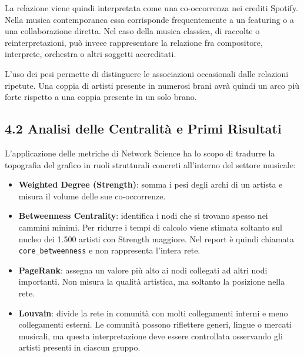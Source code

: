 \documentclass[
]{article}
\begin{document}
La relazione viene quindi interpretata come una co-occorrenza nei
crediti Spotify. Nella musica contemporanea essa corrisponde
frequentemente a un featuring o a una collaborazione diretta. Nel caso
della musica classica, di raccolte o reinterpretazioni, può invece
rappresentare la relazione fra compositore, interprete, orchestra o
altri soggetti accreditati.

L'uso dei pesi permette di distinguere le associazioni occasionali dalle
relazioni ripetute. Una coppia di artisti presente in numerosi brani
avrà quindi un arco più forte rispetto a una coppia presente in un solo
brano.

\subsection{4.2 Analisi delle Centralità e Primi
Risultati}\label{analisi-delle-centralituxe0-e-primi-risultati}

L'applicazione delle metriche di Network Science ha lo scopo di tradurre
la topografia del grafico in ruoli strutturali concreti all'interno del
settore musicale:

\begin{itemize}
\item
  \textbf{Weighted Degree (Strength)}: somma i pesi degli archi di un
  artista e misura il volume delle sue co-occorrenze.
\item
  \textbf{Betweenness Centrality}: identifica i nodi che si trovano
  spesso nei cammini minimi. Per ridurre i tempi di calcolo viene
  stimata soltanto sul nucleo dei 1.500 artisti con Strength maggiore.
  Nel report è quindi chiamata \texttt{core\_betweenness} e non
  rappresenta l'intera rete.
\item
  \textbf{PageRank}: assegna un valore più alto ai nodi collegati ad
  altri nodi importanti. Non misura la qualità artistica, ma soltanto la
  posizione nella rete.
\item
  \textbf{Louvain}: divide la rete in comunità con molti collegamenti
  interni e meno collegamenti esterni. Le comunità possono riflettere
  generi, lingue o mercati musicali, ma questa interpretazione deve
  essere controllata osservando gli artisti presenti in ciascun gruppo.
\end{itemize}
\end{document}
